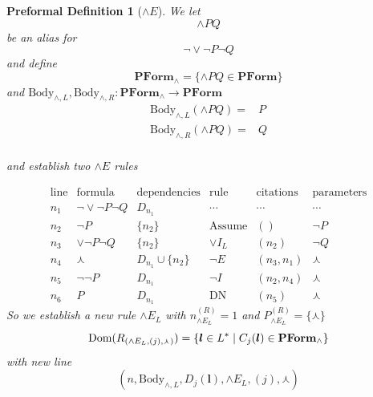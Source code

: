 \documentclass[oneside, 12pt]{book}
\theoremstyle{break}
\newtheorem{preformal definition}[definition]{Preformal Definition}
\newtheorem{preformal theorem}[theorem]{Preformal Theorem}
\newcommand{\bv}[1]{\boldsymbol{#1}}
\begin{document}
		\begin{preformal definition}[$\land E$]
			We let
			\begin{equation*}
				\land PQ
			\end{equation*}
			be an alias for
			\begin{equation*}
				\lnot \lor \lnot P \lnot Q
			\end{equation*}
			and define
			\begin{equation*}
				\textbf{PForm}_{\land} = \{\land PQ \in \textbf{PForm}\}
			\end{equation*}
			and $\text{Body}_{\land, L}, \text{Body}_{\land, R}: \textbf{PForm}_{\land} \to \textbf{PForm}$
			\begin{align*}
				\text{Body}_{\land, L}(\land PQ) =& P\\
				\text{Body}_{\land, R}(\land PQ) =& Q\\				
			\end{align*}
			
			and establish two $\land E$ rules
			
			\begin{equation*}
				\begin{array}{c|c|c|c|c|c}
					\text{line} & \text{formula} & \text{dependencies} & \text{rule} & \text{citations} & \text{parameters}\\ \hline			
					n_1 & \lnot \lor \lnot P \lnot Q & D_{n_1} & \cdots & \cdots & \cdots\\
					n_2 & \lnot P & \{n_2\} & \text{Assume} & () & \lnot P\\
					n_3 & \lor \lnot P \lnot Q & \{n_2\} & \lor I_L & (n_2) & \lnot Q\\
					n_4 & \curlywedge & D_{n_1} \cup \{n_2\} & \lnot E & (n_3, n_1) & \curlywedge\\
					n_5 & \lnot \lnot P & D_{n_1} & \lnot I & (n_2, n_4) & \curlywedge\\
					n_6 & P & D_{n_1} & \text{DN} & (n_5) & \curlywedge
				\end{array}
			\end{equation*}
			So we establish a new rule $\land E_L$ with $n_{\land E_L}^{(R)} = 1$ and $P_{\land E_L}^{(R)} = \{\curlywedge\}$
			\begin{equation*}
				\text{Dom}(R_{(\land E_L, (j), \curlywedge)}) = \{\bv{l} \in L^* \mid  C_j(\bv{l}) \in \textbf{PForm}_{\land}\}\\
			\end{equation*}
			with new line
			\begin{equation*}
				(n, \text{Body}_{\land, L}, D_j(\bv{l}), \land E_L, (j), \curlywedge)
			\end{equation*}
			

\end{preformal definition}
\end{document}
